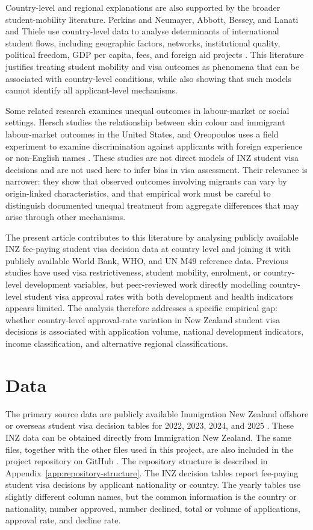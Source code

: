 \documentclass[runningheads]{llncs}
\begin{document}
Country-level and regional explanations are also supported by the broader student-mobility literature. Perkins and Neumayer, Abbott, Bessey, and Lanati and Thiele use country-level data to analyse determinants of international student flows, including geographic factors, networks, institutional quality, political freedom, GDP per capita, fees, and foreign aid projects \cite{PerkinsNeumayer2014,Abbott2016,Bessey2012,LanatiThiele2020}. This literature justifies treating student mobility and visa outcomes as phenomena that can be associated with country-level conditions, while also showing that such models cannot identify all applicant-level mechanisms.

Some related research examines unequal outcomes in labour-market or social settings. Hersch studies the relationship between skin colour and immigrant labour-market outcomes in the United States, and Oreopoulos uses a field experiment to examine discrimination against applicants with foreign experience or non-English names \cite{Hersch2008,Oreopoulos2011}. These studies are not direct models of INZ student visa decisions and are not used here to infer bias in visa assessment. Their relevance is narrower: they show that observed outcomes involving migrants can vary by origin-linked characteristics, and that empirical work must be careful to distinguish documented unequal treatment from aggregate differences that may arise through other mechanisms.

The present article contributes to this literature by analysing publicly available INZ fee-paying student visa decision data at country level and joining it with publicly available World Bank, WHO, and UN M49 reference data. Previous studies have used visa restrictiveness, student mobility, enrolment, or country-level development variables, but peer-reviewed work directly modelling country-level student visa approval rates with both development and health indicators appears limited. The analysis therefore addresses a specific empirical gap: whether country-level approval-rate variation in New Zealand student visa decisions is associated with application volume, national development indicators, income classification, and alternative regional classifications.

\section{Data}

The primary source data are publicly available Immigration New Zealand offshore or overseas student visa decision tables for 2022, 2023, 2024, and 2025 \cite{INZ2022,INZ2023,INZ2024,INZ2025}. These INZ data can be obtained directly from Immigration New Zealand. The same files, together with the other files used in this project, are also included in the project repository on GitHub \cite{KaplanINZRepo}. The repository structure is described in Appendix~\ref{app:repository-structure}. The INZ decision tables report fee-paying student visa decisions by applicant nationality or country. The yearly tables use slightly different column names, but the common information is the country or nationality, number approved, number declined, total or volume of applications, approval rate, and decline rate.
\end{document}
